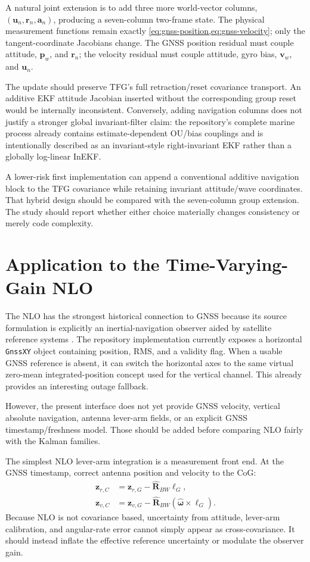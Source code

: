 \documentclass[conference]{IEEEtran}
\DeclareRobustCommand{\vct}[1]{\bm{#1}}
\DeclareRobustCommand{\mat}[1]{\bm{#1}}
\begin{document}
A natural joint extension is to add three more world-vector columns,
$(\vct u_n,\vct r_n,\vct a_n)$, producing a seven-column two-frame state.  The physical
measurement functions remain exactly
\cref{eq:gnss-position,eq:gnss-velocity}; only the tangent-coordinate Jacobians change.
The GNSS position residual must couple attitude, $\vct p_w$, and $\vct r_n$; the
velocity residual must couple attitude, gyro bias, $\vct v_w$, and $\vct u_n$.

The update should preserve TFG's full retraction/reset covariance transport.  An
additive EKF attitude Jacobian inserted without the corresponding group reset would
be internally inconsistent.  Conversely, adding navigation columns does not justify
a stronger global invariant-filter claim: the repository's complete marine process
already contains estimate-dependent OU/bias couplings and is intentionally described
as an invariant-style right-invariant EKF rather than a globally log-linear InEKF.

A lower-risk first implementation can append a conventional additive navigation block
to the TFG covariance while retaining invariant attitude/wave coordinates.  That
hybrid design should be compared with the seven-column group extension.  The study
should report whether either choice materially changes consistency or merely code
complexity.

\section{Application to the Time-Varying-Gain NLO}
\label{sec:nlo}

The NLO has the strongest historical connection to GNSS because its source formulation
is explicitly an inertial-navigation observer aided by satellite reference systems
\cite{BryneFossenJohansen2014_TVG_NLO}.  The repository implementation currently
exposes a horizontal \texttt{GnssXY} object containing position, RMS, and a validity
flag.  When a usable GNSS reference is absent, it can switch the horizontal axes to
the same virtual zero-mean integrated-position concept used for the vertical channel.
This already provides an interesting outage fallback.

However, the present interface does not yet provide GNSS velocity, vertical absolute
navigation, antenna lever-arm fields, or an explicit GNSS timestamp/freshness model.
Those should be added before comparing NLO fairly with the Kalman families.

The simplest NLO lever-arm integration is a measurement front end.  At the GNSS
timestamp, correct antenna position and velocity to the CoG:
\begin{align}
\vct z_{r,C} &= \vct z_{r,G}-\hat{\mat R}_{BW}\vct\ell_G,\\
\vct z_{v,C} &= \vct z_{v,G}
 -\hat{\mat R}_{BW}(\hat{\vct\omega}\times\vct\ell_G).
\label{eq:nlo-cog-front-end}
\end{align}
Because NLO is not covariance based, uncertainty from attitude, lever-arm calibration,
and angular-rate error cannot simply appear as cross-covariance.  It should instead
inflate the effective reference uncertainty or modulate the observer gain.
\end{document}
